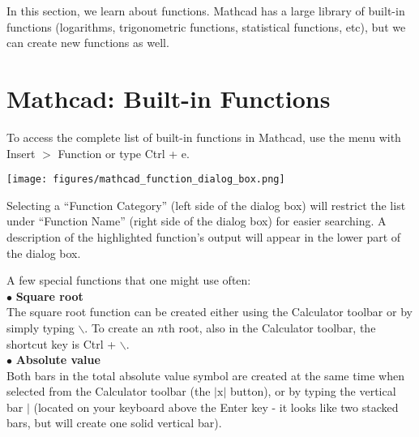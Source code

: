 In this section, we learn about functions.  Mathcad has a large library of built-in functions (logarithms, trigonometric functions, statistical functions, etc), but we can create new functions as well.  

\section{Mathcad: Built-in Functions}\label{sec:Mathcad_functions}

To access the complete list of built-in functions in Mathcad, use the menu with Insert $>$ Function or type Ctrl + e.

\begin{center}
\texttt{[image: figures/mathcad\_function\_dialog\_box.png]}
\end{center}

Selecting a ``Function Category'' (left side of the dialog box) will restrict the list under ``Function Name'' (right side of the dialog box) for easier searching.  A description of the highlighted function's output will appear in the lower part of the dialog box.

A few special functions that one might use often:\\

$\bullet$ \textbf{Square root}\\

The square root function can be created either using the Calculator toolbar or by simply typing $\backslash$.  To create an $n$th root, also in the Calculator toolbar, the shortcut key is Ctrl + $\backslash$.\\

$\bullet$ \textbf{Absolute value}\\

Both bars in the total absolute value symbol are created at the same time when selected from the Calculator toolbar (the $|\textrm{x}|$ button), or by typing the vertical bar $|$ (located on your keyboard above the Enter key - it looks like two stacked bars, but will create one solid vertical bar).\\



